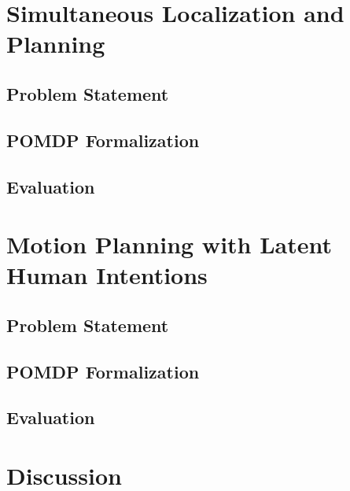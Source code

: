 \chapter{Simultaneous Localization and Planning}\label{chap:localization-and-planning}

\section{Problem Statement}
\section{POMDP Formalization}
\section{Evaluation}

\chapter{Motion Planning with Latent Human Intentions}\label{chap:motion-planning-hri}

\section{Problem Statement}
\section{POMDP Formalization}
\section{Evaluation}

\chapter{Discussion}

